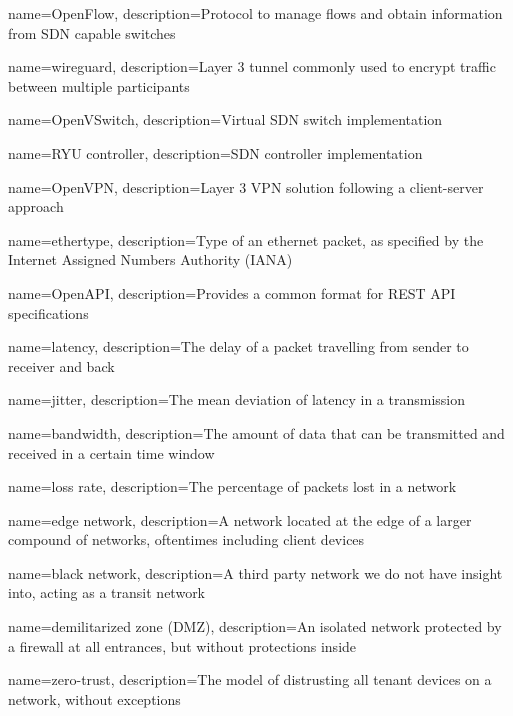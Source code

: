 \usepackage{glossaries}%
{
    name=OpenFlow,
    description={Protocol to manage flows and obtain information from SDN capable switches}
}

{
    name=wireguard,
    description={Layer 3 tunnel commonly used to encrypt traffic between multiple participants}
}

{
    name=OpenVSwitch,
    description={Virtual SDN switch implementation}
}

{
    name=RYU controller,
    description={SDN controller implementation}
}

{
    name=OpenVPN,
    description={Layer 3 VPN solution following a client-server approach}
}

{
    name=ethertype,
    description={Type of an ethernet packet, as specified by the Internet Assigned Numbers Authority (IANA)}
}

{
    name=OpenAPI,
    description={Provides a common format for REST API specifications}
}

{
    name=latency,
    description={The delay of a packet travelling from sender to receiver and back}
}

{
    name=jitter,
    description={The mean deviation of latency in a transmission}
}

{
    name=bandwidth,
    description={The amount of data that can be transmitted and received in a certain time window}
}

{
    name=loss rate,
    description={The percentage of packets lost in a network}
}

{
    name=edge network,
    description={A network located at the edge of a larger compound of networks, oftentimes including client devices}
}

{
    name=black network,
    description={A third party network we do not have insight into, acting as a transit network}
}

{
    name=demilitarized zone (DMZ),
    description={An isolated network protected by a firewall at all entrances, but without protections inside}
}

{
    name=zero-trust,
    description={The model of distrusting all tenant devices on a network, without exceptions}
}

